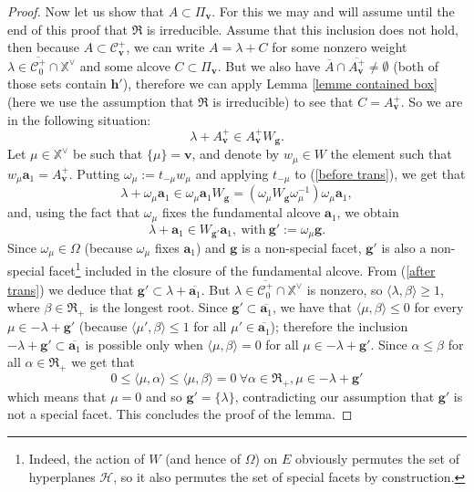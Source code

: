 \documentclass[11pt]{amsart}
\theoremstyle{plain}
\theoremstyle{remark}
\numberwithin{equation}{section}
\begin{document}
\begin{proof}
		Now let us show that $A\subset\Pi_\mathbf{v}$. For this we may and will assume until the end of this proof that $\mathfrak{R}$ is irreducible. Assume that this inclusion does not hold, then because $A\subset \mathscr{C}^+_\mathbf{v}$, we can write $A=\lambda+C$ for some nonzero weight $\lambda\in\overline{\mathscr{C}^+_0}\cap\mathbb{X}^\vee$ and some alcove $C\subset\Pi_\mathbf{v}$. But we also have $\overline{A}\cap \overline{A^+_\mathbf{v}}\neq\emptyset$ (both of those sets contain $\mathbf{h}'$), therefore we can apply Lemma \ref{lemme contained box} (here we use the assumption that $\mathfrak{R}$ is irreducible) to see that $C=A^+_\mathbf{v}$. So we are in the following situation:
		\begin{equation}\label{before trans}
			\lambda+A^+_\mathbf{v}\in A^+_\mathbf{v}W_\mathbf{g}. 
		\end{equation}
		Let $\mu\in\mathbb{X}^\vee$ be such that $\{\mu\}=\mathbf{v}$, and denote by $w_\mu\in W$ the element such that $w_\mu\mathbf{a}_1=A^+_\mathbf{v}$. Putting $\omega_\mu:=t_{-\mu}w_\mu$ and applying $t_{-\mu}$ to (\ref{before trans}), we get that
		$$\lambda+\omega_\mu\mathbf{a}_1\in \omega_\mu\mathbf{a}_1 W_\mathbf{g}=(\omega_\mu W_\mathbf{g}\omega_\mu^{-1})\omega_\mu\mathbf{a}_1, $$
		and, using the fact that $\omega_\mu$ fixes the fundamental alcove $\mathbf{a}_1$, we obtain
		\begin{equation}\label{after trans}
			\lambda+\mathbf{a}_1\in W_{\mathbf{g}'}\mathbf{a}_1,~ \text{with}~\mathbf{g}':=\omega_\mu\mathbf{g}.
		\end{equation}
		Since $\omega_\mu\in\Omega$ (because $\omega_\mu$ fixes $\mathbf{a}_1$) and $\mathbf{g}$ is a non-special facet, $\mathbf{g}'$ is also a non-special facet\footnote{Indeed, the action of $W$ (and hence of $\Omega$) on $E$ obviously permutes the set of hyperplanes $\mathcal{H}$, so it also permutes the set of special facets by construction.} included in the closure of the fundamental alcove. From (\ref{after trans}) we deduce that $\mathbf{g}'\subset \lambda+\overline{\mathbf{a}_1}$. But $\lambda\in\overline{\mathscr{C}^+_0}\cap\mathbb{X}^\vee$ is nonzero, so $\langle\lambda,\beta\rangle\geq 1$, where $\beta\in\mathfrak{R}_+$ is the longest root. Since $\mathbf{g}'\subset \overline{\mathbf{a}_1}$, we have that $\langle\mu,\beta\rangle\leq 0$ for every  $\mu\in-\lambda+\mathbf{g}'$ (because $\langle\mu',\beta\rangle\leq 1$ for all $\mu'\in\overline{\mathbf{a}_1}$); therefore the inclusion  $-\lambda+\mathbf{g}'\subset \overline{\mathbf{a}_1}$ is possible only when $\langle\mu,\beta\rangle=0$ for all $\mu\in-\lambda+\mathbf{g}'$. Since $\alpha\leq \beta$ for all $\alpha\in\mathfrak{R}_+$ we get that 
		$$0\leq \langle\mu,\alpha\rangle\leq \langle\mu,\beta\rangle=0~\forall\alpha\in\mathfrak{R}_+,\mu\in-\lambda+\mathbf{g}'$$ which means that $\mu=0$ and so $\mathbf{g}'=\{\lambda\}$, contradicting our assumption that $\mathbf{g}'$ is not a special facet. This concludes the proof of the lemma.
	\end{proof}
\end{document}
